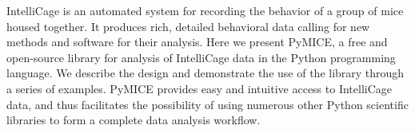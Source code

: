 IntelliCage is an automated system for recording the behavior of a group of mice 
housed together. It produces rich, detailed behavioral data calling for new 
methods and software for their analysis. Here we present PyMICE, a free and open-source
library for analysis of IntelliCage data in the Python programming language. 
We describe the design and demonstrate the use of the library through 
a series of examples.  PyMICE provides easy and intuitive 
access to IntelliCage data, and thus facilitates the possibility of using 
numerous other Python scientific libraries to form a complete data analysis workflow.
